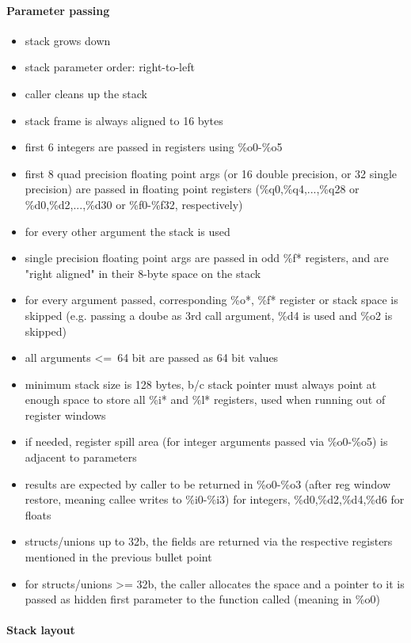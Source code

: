 \paragraph{Parameter passing}
\begin{itemize}
\item stack grows down
\item stack parameter order: right-to-left
\item caller cleans up the stack
\item stack frame is always aligned to 16 bytes
\item first 6 integers are passed in registers using \%o0-\%o5
\item first 8 quad precision floating point args (or 16 double precision, or 32 single precision) are passed in floating point registers (\%q0,\%q4,...,\%q28 or \%d0,\%d2,...,\%d30 or \%f0-\%f32, respectively)
\item for every other argument the stack is used
\item single precision floating point args are passed in odd \%f* registers, and are "right aligned" in their 8-byte space on the stack
\item for every argument passed, corresponding \%o*, \%f* register or stack space is skipped (e.g. passing a doube as 3rd call argument, \%d4 is used and \%o2 is skipped)
\item all arguments \textless=\ 64 bit are passed as 64 bit values
\item minimum stack size is 128 bytes, b/c stack pointer must always point at enough space to store all \%i* and \%l* registers, used when running out of register windows
\item if needed, register spill area (for integer arguments passed via \%o0-\%o5) is adjacent to parameters
\item results are expected by caller to be returned in \%o0-\%o3 (after reg window restore, meaning callee writes to \%i0-\%i3) for integers, \%d0,\%d2,\%d4,\%d6 for floats
\item structs/unions up to 32b, the fields are returned via the respective registers mentioned in the previous bullet point
\item for structs/unions \textgreater= 32b, the caller allocates the space and a pointer to it is passed as hidden first parameter to the function called (meaning in \%o0)
\end{itemize}

\paragraph{Stack layout}


